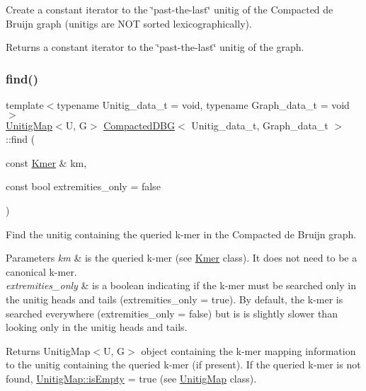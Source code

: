 Create a constant iterator to the \char`\"{}past-\/the-\/last\char`\"{} unitig of the Compacted de Bruijn graph (unitigs are N\+OT sorted lexicographically). 

\begin{DoxyReturn}{Returns}
a constant iterator to the \char`\"{}past-\/the-\/last\char`\"{} unitig of the graph. 
\end{DoxyReturn}
\mbox{\label{classCompactedDBG_ad7c880affe4d79ec249f9384da1d3d65}} 
\subsubsection{\texorpdfstring{find()}{find()}\hspace{0.1cm}{\footnotesize\ttfamily [1/2]}}
{\footnotesize\ttfamily template$<$typename Unitig\+\_\+data\+\_\+t = void, typename Graph\+\_\+data\+\_\+t = void$>$ \\
\hyperlink{classUnitigMap}{Unitig\+Map}$<$U, G$>$ \hyperlink{classCompactedDBG}{Compacted\+D\+BG}$<$ Unitig\+\_\+data\+\_\+t, Graph\+\_\+data\+\_\+t $>$\+::find (\begin{DoxyParamCaption}\item[{const \hyperlink{classKmer}{Kmer} \&}]{km,  }\item[{const bool}]{extremities\+\_\+only = {\ttfamily false} }\end{DoxyParamCaption})}



Find the unitig containing the queried k-\/mer in the Compacted de Bruijn graph. 


\begin{DoxyParams}{Parameters}
{\em km} & is the queried k-\/mer (see \hyperlink{classKmer}{Kmer} class). It does not need to be a canonical k-\/mer. \\
\hline
{\em extremities\+\_\+only} & is a boolean indicating if the k-\/mer must be searched only in the unitig heads and tails (extremities\+\_\+only = true). By default, the k-\/mer is searched everywhere (extremities\+\_\+only = false) but is is slightly slower than looking only in the unitig heads and tails. \\
\hline
\end{DoxyParams}
\begin{DoxyReturn}{Returns}
Unitig\+Map$<$\+U, G$>$ object containing the k-\/mer mapping information to the unitig containing the queried k-\/mer (if present). If the queried k-\/mer is not found, \hyperlink{structUnitigMapBase_ade629940b2611494dbf233cb1144da80}{Unitig\+Map\+::is\+Empty} = true (see \hyperlink{classUnitigMap}{Unitig\+Map} class). 
\end{DoxyReturn}
\mbox{\label{classCompactedDBG_acca2582e9bf7abd1f2fdd15223d5b80a}} 
